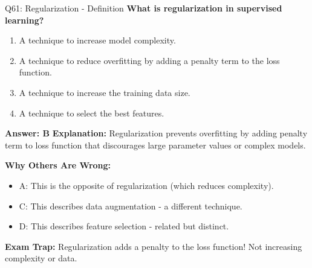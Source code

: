 \documentclass[8pt]{beamer}
\begin{document}
	\begin{frame}{Q61: Regularization - Definition}
		\fontsize{6.5}{7.5}\selectfont
		\textbf{What is regularization in supervised learning?}
		
		\begin{enumerate}
			\item A technique to increase model complexity.
			\item A technique to reduce overfitting by adding a penalty term to the loss function.
			\item A technique to increase the training data size.
			\item A technique to select the best features.
		\end{enumerate}
		
		\vspace{0.05cm}
		\textcolor{myblue}{\textbf{Answer: B}}
		\vspace{0.05cm}
		\textcolor{myblue}{\textbf{Explanation:}} Regularization prevents overfitting by adding penalty term to loss function that discourages large parameter values or complex models.
		
		\vspace{0.05cm}
		\textcolor{myred}{\textbf{Why Others Are Wrong:}}
		\begin{itemize}
			\item \textcolor{myred}{A:} This is the opposite of regularization (which reduces complexity).
			\item \textcolor{myred}{C:} This describes data augmentation - a different technique.
			\item \textcolor{myred}{D:} This describes feature selection - related but distinct.
		\end{itemize}
		
		\textcolor{myred}{\textbf{Exam Trap:}} Regularization adds a \textcolor{myblue}{penalty} to the loss function! Not increasing complexity or data.
	\end{frame}
	
\end{document}
